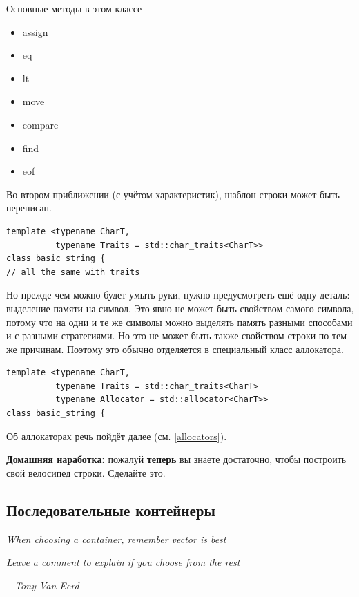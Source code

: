 \documentclass[a4paper,12pt,oneside]{article}
\begin{document}
Основные методы в этом классе

\begin{itemize}
\item assign
\item eq
\item lt
\item move
\item compare
\item find
\item eof
\end{itemize}

Во втором приближении (с учётом характеристик), шаблон строки может быть переписан.

\begin{lstlisting}
template <typename CharT,
          typename Traits = std::char_traits<CharT>> 
class basic_string {
// all the same with traits
\end{lstlisting}

Но прежде чем можно будет умыть руки, нужно предусмотреть ещё одну деталь: выделение памяти на символ. Это явно не может быть свойством самого символа, потому что на одни и те же символы можно выделять память разными способами и с разными стратегиями. Но это не может быть также свойством строки по тем же причинам. Поэтому это обычно отделяется в специальный класс аллокатора.

\begin{lstlisting}
template <typename CharT,
          typename Traits = std::char_traits<CharT>
          typename Allocator = std::allocator<CharT>> 
class basic_string {
\end{lstlisting}

Об аллокаторах речь пойдёт далее (см. \ref{allocators}).

\textbf{Домашняя наработка:} пожалуй \textbf{теперь} вы знаете достаточно, чтобы построить свой велосипед строки. Сделайте это.

\pagebreak
\subsection{Последовательные контейнеры}\label{SeqContainers}

\hfill\textit{When choosing a container, remember vector is best}

\hfill\textit{Leave a comment to explain if you choose from the rest}{\vspace{0.5em}}

\hfill\textit{-- Tony Van Eerd}
\end{document}

